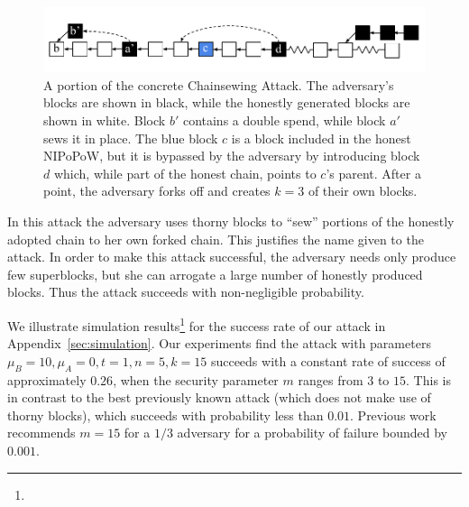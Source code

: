\begin{figure}[h!]
	\begin{center}
		\includegraphics[width=0.8\columnwidth]{figures/chainsew-concrete.pdf}
	\end{center}
	\caption{A portion of the concrete Chainsewing Attack. The adversary's blocks are shown in black, while the honestly generated blocks are shown in white. Block $b'$ contains a double spend, while block $a'$ sews it in place. The blue block $c$ is a block included in the honest NIPoPoW, but it is bypassed by the adversary by introducing block $d$ which, while part of the honest chain, points to $c$'s parent. After a point, the adversary forks off and creates $k = 3$ of their own blocks.}
	\label{fig:attack}
\end{figure}

In this attack the adversary uses thorny blocks to ``sew'' portions of the
honestly adopted chain to her own forked chain. This justifies the name given to
the attack.
In order to make this attack successful, the adversary needs only
produce few superblocks, but she can arrogate a large number of
honestly produced blocks. Thus the attack succeeds with non-negligible
probability.

We illustrate simulation results\footnote{\fi} for the success rate of our attack in Appendix~\ref{sec:simulation}. Our experiments find the attack with parameters $\mu_B = 10, \mu_A = 0, t = 1, n = 5, k = 15$ succeeds with a constant rate of success of approximately $0.26$, when the security parameter $m$ ranges from $3$ to $15$. This is in contrast to the best previously known attack (which does not make use of thorny blocks), which succeeds with probability less than $0.01$. Previous work recommends $m = 15$ for a $1/3$ adversary for a probability of failure bounded by $0.001$.
